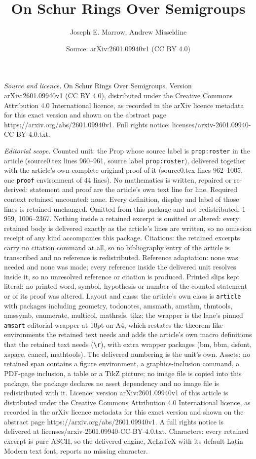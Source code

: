 \documentclass[10pt,a4paper]{amsart}
\title[On Schur Rings Over Semigroups]{On Schur Rings Over Semigroups}
\author{Joseph E. Marrow, Andrew Misseldine}
\date{Source: arXiv:2601.09940v1 (CC BY 4.0)}
\begin{document}
\maketitle

\noindent\emph{Source and licence.} On Schur Rings Over Semigroups. Version arXiv:2601.09940v1 (CC BY 4.0), distributed under the Creative Commons Attribution 4.0 International licence, as recorded in the arXiv licence metadata for this exact version and shown on the abstract page https://arxiv.org/abs/2601.09940v1. Full rights notice: licenses/arxiv-2601.09940-CC-BY-4.0.txt.\par\smallskip

\noindent\textit{Editorial scope.} Counted unit: the Prop whose source label is \texttt{prop:roster} in the article (source0.tex lines 960--961, source label \texttt{prop:roster}), delivered together with the article's own complete original proof of it (source0.tex lines 962--1005, one \texttt{proof} environment of 44 lines). No mathematics is written, repaired or re-derived: statement and proof are the article's own text line for line. Required context retained uncounted: none. Every definition, display and label of those lines is retained unchanged. Omitted from this package and not redistributed: 1--959, 1006--2367. Nothing inside a retained excerpt is omitted or altered: every retained body is delivered exactly as the article's lines are written, so no omission receipt of any kind accompanies this package. Citations: the retained excerpts carry no citation command at all, so no bibliography entry of the article is transcribed and no reference is redistributed. Reference adaptation: none was needed and none was made; every reference inside the delivered unit resolves inside it, so no unresolved reference or citation is produced. Printed slips kept literal: no printed word, symbol, hypothesis or number of the counted statement or of its proof was altered. Layout and class: the article's own class is \texttt{article} with packages including geometry, todonotes, amsmath, amsthm, thmtools, amssymb, enumerate, multicol, mathrsfs, tikz; the wrapper is the lane's pinned \texttt{amsart} editorial wrapper at 10pt on A4, which restates the theorem-like environments the retained text needs and adds the article's own macro definitions that the retained text needs (\texttt{\textbackslash r}), with extra wrapper packages (bm, bbm, dsfont, xspace, cancel, mathtools). The delivered numbering is the unit's own. Assets: no retained span contains a figure environment, a graphics-inclusion command, a PDF-page inclusion, a table or a TikZ picture; no image file is copied into this package, the package declares no asset dependency and no image file is redistributed with it. Licence: version arXiv:2601.09940v1 of this article is distributed under the Creative Commons Attribution 4.0 International licence, as recorded in the arXiv licence metadata for this exact version and shown on the abstract page https://arxiv.org/abs/2601.09940v1. A full rights notice is delivered at licenses/arxiv-2601.09940-CC-BY-4.0.txt. Characters: every retained excerpt is pure ASCII, so the delivered engine, XeLaTeX with its default Latin Modern text font, reports no missing character.
\end{document}
